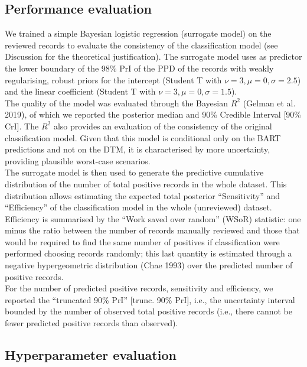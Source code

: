\documentclass{article}
\begin{document}
\hypertarget{performance-evaluation}{%
\subsection{Performance evaluation}\label{performance-evaluation}}

We trained a simple Bayesian logistic regression (surrogate model) on
the reviewed records to evaluate the consistency of the classification
model (see Discussion for the theoretical justification). The surrogate
model uses as predictor the lower boundary of the 98\% PrI of the PPD of
the records with weakly regularising, robust priors for the intercept
(Student T with \(\nu=3,\mu=0,\sigma=2.5\)) and the linear coefficient
(Student T with \(\nu=3,\mu=0,\sigma=1.5\)).\\
The quality of the model was evaluated through the Bayesian \(R^2\)
(Gelman et al. 2019), of which we reported the posterior median and 90\%
Credible Interval {[}90\% CrI{]}. The \(R^2\) also provides an
evaluation of the consistency of the original classification model.
Given that this model is conditional only on the BART predictions and
not on the DTM, it is characterised by more uncertainty, providing
plausible worst-case scenarios.\\
The surrogate model is then used to generate the predictive cumulative
distribution of the number of total positive records in the whole
dataset. This distribution allows estimating the expected total
posterior ``Sensitivity'' and ``Efficiency'' of the classification model
in the whole (unreviewed) dataset. Efficiency is summarised by the
``Work saved over random'' (WSoR) statistic: one minus the ratio between
the number of records manually reviewed and those that would be required
to find the same number of positives if classification were performed
choosing records randomly; this last quantity is estimated through a
negative hypergeometric distribution (Chae 1993) over the predicted
number of positive records.\\
For the number of predicted positive records, sensitivity and
efficiency, we reported the ``truncated 90\% PrI'' {[}trunc. 90\%
PrI{]}, i.e., the uncertainty interval bounded by the number of observed
total positive records (i.e., there cannot be fewer predicted positive
records than observed).

\hypertarget{hyperparameter-evaluation}{%
\subsection{Hyperparameter evaluation}\label{hyperparameter-evaluation}}
\end{document}
